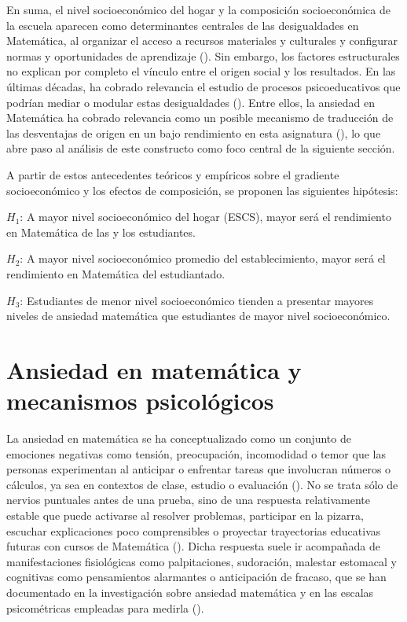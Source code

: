 \documentclass[
  spanish,
  a4paper,
  oneside]{scrbook}
\begin{document}
En suma, el nivel socioeconómico del hogar y la composición
socioeconómica de la escuela aparecen como determinantes centrales de
las desigualdades en Matemática, al organizar el acceso a recursos
materiales y culturales y configurar normas y oportunidades de
aprendizaje (). Sin embargo, los factores estructurales no explican por completo
el vínculo entre el origen social y los resultados. En las últimas
décadas, ha cobrado relevancia el estudio de procesos psicoeducativos
que podrían mediar o modular estas desigualdades
(). Entre ellos, la ansiedad en
Matemática ha cobrado relevancia como un posible mecanismo de traducción
de las desventajas de origen en un bajo rendimiento en esta asignatura
(), lo que abre paso al
análisis de este constructo como foco central de la siguiente sección.

A partir de estos antecedentes teóricos y empíricos sobre el gradiente
socioeconómico y los efectos de composición, se proponen las siguientes
hipótesis:

\(H_{1}\): A mayor nivel socioeconómico del hogar (ESCS), mayor será el
rendimiento en Matemática de las y los estudiantes.

\(H_{2}\): A mayor nivel socioeconómico promedio del establecimiento,
mayor será el rendimiento en Matemática del estudiantado.

\(H_{3}\): Estudiantes de menor nivel socioeconómico tienden a presentar
mayores niveles de ansiedad matemática que estudiantes de mayor nivel
socioeconómico.

\section{Ansiedad en matemática y mecanismos
psicológicos}\label{ansiedad-en-matemuxe1tica-y-mecanismos-psicoluxf3gicos}

La ansiedad en matemática se ha conceptualizado como un conjunto de
emociones negativas como tensión, preocupación, incomodidad o temor que
las personas experimentan al anticipar o enfrentar tareas que involucran
números o cálculos, ya sea en contextos de clase, estudio o evaluación
(). No se trata sólo de
nervios puntuales antes de una prueba, sino de una respuesta
relativamente estable que puede activarse al resolver problemas,
participar en la pizarra, escuchar explicaciones poco comprensibles o
proyectar trayectorias educativas futuras con cursos de Matemática
(). Dicha
respuesta suele ir acompañada de manifestaciones fisiológicas como
palpitaciones, sudoración, malestar estomacal y cognitivas como
pensamientos alarmantes o anticipación de fracaso, que se han
documentado en la investigación sobre ansiedad matemática y en las
escalas psicométricas empleadas para medirla
().
\end{document}
